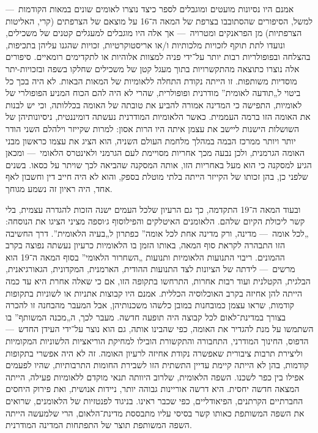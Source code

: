 אמנם היו נסיונות מועטים ומוגבלים לספר כיצד נוצרו לאומים שונים במאות הקודמות~— למשל, הסיפורים שהסתובבו בצרפת של המאה ה־16 על מוצאם של הצרפתים (קרי, האליטות הצרפתיות) מן הפראנקים ומטרויה~— אך אלה היו מוגבלים למעגלים קטנים של משכילים, ונועדו לתת תוקף לזכויות מלכותיות ו/או אריסטוקרטיות, זכויות שהגנו עליהן בתכיפות, בהצלחה ובפופולריות רבות יותר על־ידי פניה למצוות אלוהיות או לתקדימים רומאיים. סיפורים אלה נוצרו כתוצאה מהתקשרויות בתוך מעגל קטן של משכילים שחלקו בשפה ובזכויות-יתר מוסדיות משותפות. זו הייתה נקודת התחלה ללאומיות של המאות הבאות. לא היה בכך כל ביטוי ל„תודעה לאומית” מודרנית ופופולרית, שהרי לא היה להם הכוח המניע הפופולרי של לאומיות, התפישה כי המדינה אמורה להביע את טובתה של האומה בכללותה, וכי יש לבנות את האומה הזו ברמה העממית. כאשר הלאומיות המודרנית נעשתה דומיננטית, ניסיונותיהן של השושלות הישנות ליישב את עצמן איתה היו הרות אסון: למרות שקייזר וילהלם השני הודר יותר ויותר ממרכז הבמה במהלך מלחמת העולם השניה, הוא הציג את עצמו כראשון מבני האומה הגרמנית, ולכן נבעה מכך אחריות מסויימת לעם הגרמני ולאינטרס הלאומי~— ומכאן הגיע למסקנה כי הוא מעל באחריות הזו, אותה המסקנה שהביאה לכך שויתר על כסאו. בשנים שלפני כן, בהן זכותו של הקייזר הייתה בלתי מוטלת בספק, והוא לא היה חייב דין וחשבון לאף אחד, היה ראיון זה נשמע מגוחך.

ובעוד המאה ה־19 התקדמה, כך גם הרעיון שלכל העמים ישנה הזכות להגדרה עצמית, בלי קשר ליכולת הקיום שלהם. הלאומנים האיטלקים והפילוסוף ג׳וספה מציני הציגו את הנוסחה: „לכל אומה~— מדינה, ורק מדינה אחת לכל אומה” כפתרון ל„בעיה הלאומית”. דרך החשיבה הזו התבהרה לקראת סוף המאה, באותו הזמן בו הלאומיות כרעיון נעשתה נפוצה בקרב ההמונים. ריבוי התנועות הלאומיות ותנועות „השחרור הלאומי” בסוף המאה ה־19 הוא מרשים~— לידתה של הציונות לצד התנועות ההודית, הארמנית, המקדונית, הגאורגיאנית, הבלגית, הקטלנית ועוד רבות אחרות, התרחשו בתקופה הזו, אם כי שאלה אחרת היא עד כמה הייתה להן אחיזה בקרב האוכלוסיה הכללית. אמנם היו קבוצות אתניות או לשוניות בתקופות קודמות, שראו עצמן כמובחנות במובן כלשהו משכנותיהן, אבל המעבר מהבחנה זו להכרה בצורך במדינת־לאום לכל קבוצה היה תופעה חדשה. מעבר לכך, ה„מכנה המשותף” בו השתמשו על מנת להגדיר את האומה, כפי שהבינו אותה, גם הוא נוצר על־ידי העידן החדש~— הדפוס, החינוך המודרני, התחבורה והתקשורת הובילו למחיקת הוריאציות הלשוניות המקומיות וליצירת תרבות ציבורית שאפשרה נקודת אחיזה לרעיון האומה. זה לא היה אפשרי בתקופות קודמות, בהן לא הייתה קיימת עדיין התשתית הזו לשבירת החומות התרבותיות, שהיו לפעמים אפילו בין כפר לשכנו. השפה הלאומית, שלרוב היוותה תנאי מוקדם ללאומיות פעילה, הייתה המצאה חדשה יחסית. היא דרשה אוריינות גבוהה יותר, ניידות אנושית, ואת פירוק היחסים החברתיים הקרתנים, הפיאודליים, כפי שכבר ראינו. בניגוד לפנטזיות של הלאומנים, שרואים את השפה המשותפת כאותו קשר בסיסי עליו מתבססת מדינת־הלאום, הרי שלמעשה הייתה השפה המשותפת תוצר של התפתחות המדינה המודרנית.

